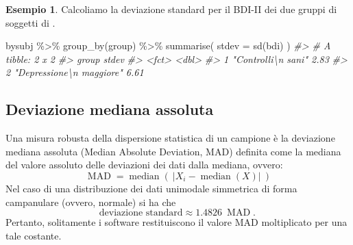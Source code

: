 \documentclass[
  10pt,
  italian,
  a4paper,
  extrafontsizes,onecolumn,openright
  ]{memoir}
\newenvironment{Shaded}{\begin{snugshade}}{\end{snugshade}}
\newcommand{\AttributeTok}[1]{\textcolor[rgb]{0.77,0.63,0.00}{#1}}
\newcommand{\CommentTok}[1]{\textcolor[rgb]{0.56,0.35,0.01}{\textit{#1}}}
\newcommand{\FunctionTok}[1]{\textcolor[rgb]{0.00,0.00,0.00}{#1}}
\newcommand{\NormalTok}[1]{#1}
\newcommand{\SpecialCharTok}[1]{\textcolor[rgb]{0.00,0.00,0.00}{#1}}
\theoremstyle{definition}
\theoremstyle{definition}
\newtheorem{example}{Esempio}[chapter]
\theoremstyle{definition}
\theoremstyle{definition}
\theoremstyle{remark}
\begin{document}
\begin{example}

Calcoliamo la deviazione standard per il BDI-II dei due gruppi di soggetti di \textcite{zetschefuture2019}.

\begin{Shaded}
\begin{Highlighting}[]
\NormalTok{bysubj }\SpecialCharTok{\%\textgreater{}\%}
  \FunctionTok{group\_by}\NormalTok{(group) }\SpecialCharTok{\%\textgreater{}\%}
  \FunctionTok{summarise}\NormalTok{(}
    \AttributeTok{stdev =} \FunctionTok{sd}\NormalTok{(bdi)}
\NormalTok{  )}
\CommentTok{\#\textgreater{} \# A tibble: 2 x 2}
\CommentTok{\#\textgreater{}   group                    stdev}
\CommentTok{\#\textgreater{}   \textless{}fct\textgreater{}                    \textless{}dbl\textgreater{}}
\CommentTok{\#\textgreater{} 1 "Controlli\textbackslash{}n sani"        2.83}
\CommentTok{\#\textgreater{} 2 "Depressione\textbackslash{}n maggiore"  6.61}
\end{Highlighting}
\end{Shaded}

\end{example}

\hypertarget{deviazione-mediana-assoluta}{%
\subsection{Deviazione mediana assoluta}\label{deviazione-mediana-assoluta}}

Una misura robusta della dispersione statistica di un campione è la deviazione mediana assoluta (Median Absolute Deviation, MAD) definita come la mediana del valore assoluto delle deviazioni dei dati dalla mediana, ovvero:
\[
{\displaystyle \operatorname {MAD} =\operatorname {median} \left(\ \left|X_{i}-\operatorname {median} (X)\right|\ \right)}
\]
Nel caso di una distribuzione dei dati unimodale simmetrica di forma campanulare (ovvero, normale) si ha che
\[
{\displaystyle \text{deviazione standard} \approx 1.4826\ \operatorname {MAD} .\,}
\]
Pertanto, solitamente i software restituiscono il valore MAD moltiplicato per una tale costante.
\end{document}

